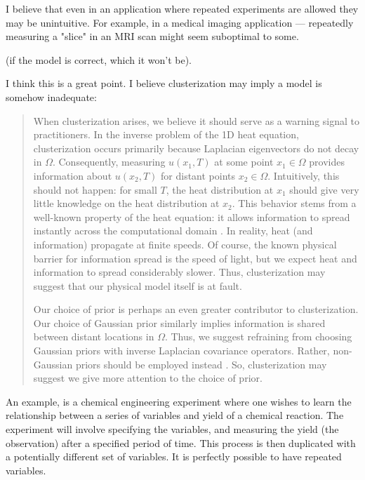 \AR I believe that even in an application where repeated experiments
are allowed they may be unintuitive. For example, in a medical imaging
application --- repeatedly measuring a "slice" in an MRI scan might
seem suboptimal to some.


\RC (if the model is correct, which it won’t be).

\AR I think this is a great point. I believe clusterization may imply
a model is somehow inadequate:

\begin{quote}
  When clusterization arises, we believe it should serve as a warning
  signal to practitioners. In the inverse problem of the 1D heat
  equation, clusterization occurs primarily because Laplacian
  eigenvectors do not decay in $\Omega$. Consequently, measuring
  $u(x_1, T)$ at some point $x_1 \in \Omega$ provides information
  about $u(x_2,T)$ for distant points $x_2 \in \Omega$. Intuitively,
  this should not happen: for small $T$, the heat distribution at
  $x_1$ should give very little knowledge on the heat distribution at
  $x_2$. This behavior stems from a well-known property of the heat
  equation: it allows information to spread instantly across the
  computational domain \cite{renardy2006PDE}. In reality, heat (and
  information) propagate at finite speeds. Of course, the known
  physical barrier for information spread is the speed of light, but
  we expect heat and information to spread considerably slower. Thus,
  clusterization may suggest that our physical model itself is at
  fault.
  
  Our choice of prior is perhaps an even greater contributor to
  clusterization. Our choice of Gaussian prior similarly implies
  information is shared between distant locations in $\Omega$. Thus,
  we suggest refraining from choosing Gaussian priors with inverse
  Laplacian covariance operators. Rather, non-Gaussian priors should
  be employed instead \cite{hosseini2017, hosseini2019}. So,
  clusterization may suggest we give more attention to the choice of
  prior.
\end{quote}



\RC An example, is a chemical engineering experiment where one wishes
to learn the relationship between a series of variables and yield of a
chemical reaction. The experiment will involve specifying the
variables, and measuring the yield (the observation) after a specified
period of time. This process is then duplicated with a potentially
different set of variables.  It is perfectly possible to have repeated
variables.

